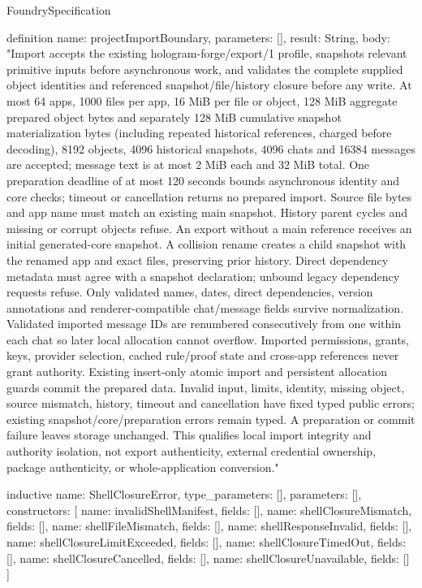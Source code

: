 \begin{lexlean}{FoundrySpecification}
\begin{semanticmodule}
definition{
  name: projectImportBoundary,
  parameters: [],
  result: String,
  body: "Import accepts the existing hologram-forge/export/1 profile, snapshots relevant primitive inputs before asynchronous work, and validates the complete supplied object identities and referenced snapshot/file/history closure before any write. At most 64 apps, 1000 files per app, 16 MiB per file or object, 128 MiB aggregate prepared object bytes and separately 128 MiB cumulative snapshot materialization bytes (including repeated historical references, charged before decoding), 8192 objects, 4096 historical snapshots, 4096 chats and 16384 messages are accepted; message text is at most 2 MiB each and 32 MiB total. One preparation deadline of at most 120 seconds bounds asynchronous identity and core checks; timeout or cancellation returns no prepared import. Source file bytes and app name must match an existing main snapshot. History parent cycles and missing or corrupt objects refuse. An export without a main reference receives an initial generated-core snapshot. A collision rename creates a child snapshot with the renamed app and exact files, preserving prior history. Direct dependency metadata must agree with a snapshot declaration; unbound legacy dependency requests refuse. Only validated names, dates, direct dependencies, version annotations and renderer-compatible chat/message fields survive normalization. Validated imported message IDs are renumbered consecutively from one within each chat so later local allocation cannot overflow. Imported permissions, grants, keys, provider selection, cached rule/proof state and cross-app references never grant authority. Existing insert-only atomic import and persistent allocation guards commit the prepared data. Invalid input, limits, identity, missing object, source mismatch, history, timeout and cancellation have fixed typed public errors; existing snapshot/core/preparation errors remain typed. A preparation or commit failure leaves storage unchanged. This qualifies local import integrity and authority isolation, not export authenticity, external credential ownership, package authenticity, or whole-application conversion."
}

inductive{
  name: ShellClosureError,
  type_parameters: [],
  parameters: [],
  constructors: [
    {name: invalidShellManifest, fields: []},
    {name: shellClosureMismatch, fields: []},
    {name: shellFileMismatch, fields: []},
    {name: shellResponseInvalid, fields: []},
    {name: shellClosureLimitExceeded, fields: []},
    {name: shellClosureTimedOut, fields: []},
    {name: shellClosureCancelled, fields: []},
    {name: shellClosureUnavailable, fields: []}
  ]
}


\end{semanticmodule}
\end{lexlean}
